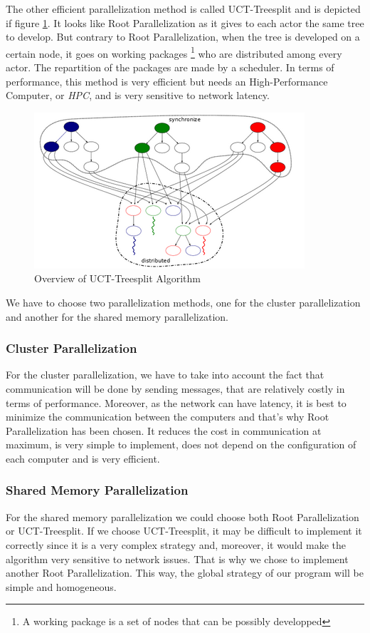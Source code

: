 The other efficient parallelization method is called UCT-Treesplit and is depicted if figure \ref{fig:treesplit}. It looks like Root Parallelization as it gives to each actor the same tree to develop.
But contrary to Root Parallelization, when the tree is developed on a certain node, it goes on working packages \footnote{A working package is a set of nodes that can be possibly developped} who are distributed among every actor. The repartition of the packages are made by a scheduler.
In terms of performance, this method is very efficient but needs an High-Performance Computer, or \emph{HPC}, and is very sensitive to network latency.

\begin{figure}[!h] 
\centerline{\includegraphics[scale=0.80]{3Methods/3.1Parallelization_Method/treesplit.png}}
   \caption{Overview of UCT-Treesplit Algorithm}
\label{fig:treesplit}
\end{figure}


We have to choose two parallelization methods, one for the cluster parallelization and another for the shared memory parallelization.
\subsubsection{Cluster Parallelization}
For the cluster parallelization, we have to take into account the fact that communication will be done by sending messages, that are relatively costly in terms of performance.
Moreover, as the network can have latency, it is best to minimize the communication between the computers and that's why Root Parallelization has been chosen.
It reduces the cost in communication at maximum, is very simple to implement, does not depend on the configuration of each computer and is very efficient.
\subsubsection{Shared Memory Parallelization}
For the shared memory parallelization we could choose both Root Parallelization or UCT-Treesplit.
If we choose UCT-Treesplit, it may be difficult to implement it correctly since it is a very complex strategy and, moreover, it would make the algorithm very sensitive to network issues. That is why we chose to implement another Root Parallelization. This way, the global strategy of our program will be simple and homogeneous.

